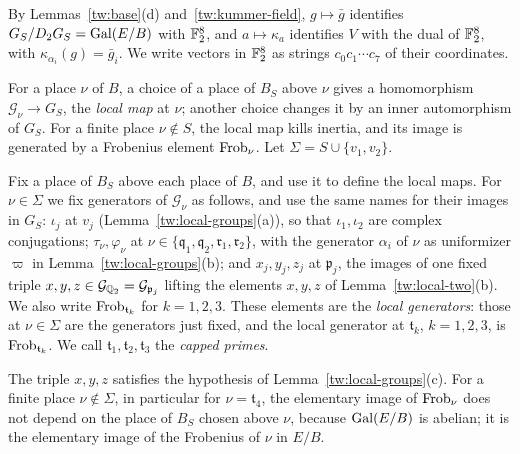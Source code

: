 By Lemmas~\ref{tw:base}(d) and~\ref{tw:kummer-field}, $g\mapsto\bar g$
identifies $G_S/D_2G_S=\operatorname{Gal}(E/B)$ with $\mathbb F_2^8$, and $a\mapsto\kappa_a$
identifies $V$ with the dual of $\mathbb F_2^8$, with $\kappa_{\alpha_i}(g)=\bar g_i$.
We write vectors in $\mathbb F_2^8$ as strings $c_0c_1\cdots c_7$ of their
coordinates.

For a place $\nu$ of $B$, a choice of a place of $B_S$ above $\nu$ gives a
homomorphism $\mathcal G_\nu\to G_S$, the \emph{local map} at $\nu$; another
choice changes it by an inner automorphism of $G_S$. For a finite
place $\nu\notin S$, the local map kills inertia, and its image is generated
by a Frobenius element $\operatorname{Frob}_\nu$. Let $\Sigma=S\cup\{v_1,v_2\}$.

\begin{definition}\label{tw:local-generators}
Fix a place of $B_S$ above each place of $B$, and use it to define the local
maps. For $\nu\in\Sigma$ we fix generators of $\mathcal G_\nu$ as follows,
and use the same names for their images in $G_S$: $\iota_j$ at $v_j$
(Lemma~\ref{tw:local-groups}(a)), so that $\iota_1,\iota_2$ are complex
conjugations; $\tau_\nu,\varphi_\nu$ at
$\nu\in\{\mathfrak q_1,\mathfrak q_2,\mathfrak r_1,\mathfrak r_2\}$, with the
generator $\alpha_i$ of $\nu$ as uniformizer $\varpi$ in
Lemma~\ref{tw:local-groups}(b); and $x_j,y_j,z_j$ at $\mathfrak p_j$, the
images of one fixed triple $x,y,z\in\mathcal G_{\mathbb Q_2}=\mathcal G_{\mathfrak p_j}$
lifting the elements $x,y,z$ of Lemma~\ref{tw:local-two}(b). We also write
$\operatorname{Frob}_{\mathfrak t_k}$ for $k=1,2,3$. These elements are the \emph{local
generators}: those at $\nu\in\Sigma$ are the generators just fixed, and the
local generator at $\mathfrak t_k$, $k=1,2,3$, is $\operatorname{Frob}_{\mathfrak t_k}$. We
call $\mathfrak t_1,\mathfrak t_2,\mathfrak t_3$ the \emph{capped primes}.
\end{definition}

The triple $x,y,z$ satisfies the hypothesis of
Lemma~\ref{tw:local-groups}(c). For a finite place $\nu\notin\Sigma$, in
particular for $\nu=\mathfrak t_4$, the elementary image of $\operatorname{Frob}_\nu$ does
not depend on the place of $B_S$ chosen above $\nu$, because $\operatorname{Gal}(E/B)$ is
abelian; it is the elementary image of the Frobenius of $\nu$ in $E/B$.

